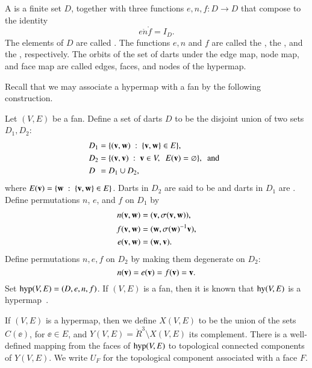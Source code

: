 \documentclass{llncs}
\def\op#1{{\hbox{#1}}}
\begin{document}
\begin{definition}[hypermap]   A  is a finite set $D$, together with three functions
  $e,n,f:D\to D$ that compose to the identity
  \[ 
e\ocirc n\ocirc f = I_D.
\]  The
elements of $D$ are called .  The functions $e,n$ and
$f$ are called the , the , and
the , respectively. 
The orbits of the set of darts under the edge map, node map, and face map are called edges, faces, and nodes of the hypermap.
\end{definition}

Recall that we may associate a hypermap with  a fan by the following
construction.

Let $(V,E)$ be a fan.  Define a set of darts $D$ to be the disjoint union of
two sets $D_1,D_2$:
\begin{align*}
D_1 &= \{({\mathbf v},{\mathbf w})\ :\  \{{\mathbf v},{\mathbf w}\}\in E\},\\
D_2 &= \{({\mathbf v},{\mathbf v}) \ :\  {\mathbf v}\in V,\ \ E({\mathbf v}) = \varnothing\},\text{ \ and \ } \\
D\phantom{_2}   &= D_1\cup D_2,
\end{align*}
where $E({\mathbf v})=\{{\mathbf w} \ :\  \{{\mathbf v},{\mathbf w}\}\in E\}$.
Darts in $D_2$ are said to be  and darts in
$D_1$ are .
%
Define permutations $n$, $e$, and $f$ on $D_1$ by
\begin{align*}n({\mathbf v},{\mathbf w}) &= ({\mathbf v},\sigma({\mathbf v},{\mathbf w})),\\
f ({\mathbf v},{\mathbf w}) &= ({\mathbf w},\sigma({\mathbf w})^{-1} {\mathbf v}),\\
e ({\mathbf v},{\mathbf w}) &= ({\mathbf w},{\mathbf v}).
\end{align*}
Define permutations $n,e,f$ on $D_2$ by making them degenerate on $D_2$:
\[ 
n ({\mathbf v}) = e({\mathbf v}) = f({\mathbf v}) = {\mathbf v}.
\] 
Set %
$\op{hyp}(V,E)=(D,e,n,f)$. 
If $(V,E)$ is a fan, 
then it is known that $\op{hy}(V,E)$ is a hypermap~\cite{dsp}.

If $(V,E)$ is a hypermap, then we
define $X(V,E)$ to be the union of the sets $C(\ee)$, for $\ee\in E$,
and $Y(V,E) = \ring{R}^3 \setminus X(V,E)$ its complement.  There is
a well-defined mapping from the faces of $\op{hyp}(V,E)$ to topological
connected components of $Y(V,E)$.  We write $U_F$ for the topological
component associated with a face $F$.
\end{document}
